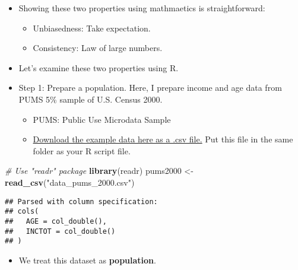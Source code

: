 \documentclass[]{book}
\newenvironment{Shaded}{\begin{snugshade}}{\end{snugshade}}
\newcommand{\KeywordTok}[1]{\textcolor[rgb]{0.13,0.29,0.53}{\textbf{#1}}}
\newcommand{\StringTok}[1]{\textcolor[rgb]{0.31,0.60,0.02}{#1}}
\newcommand{\CommentTok}[1]{\textcolor[rgb]{0.56,0.35,0.01}{\textit{#1}}}
\newcommand{\OperatorTok}[1]{\textcolor[rgb]{0.81,0.36,0.00}{\textbf{#1}}}
\newcommand{\NormalTok}[1]{#1}
\providecommand{\tightlist}{%
  \setlength{\itemsep}{0pt}\setlength{\parskip}{0pt}}
\begin{document}
\begin{itemize}
\item
  Showing these two properties using mathmaetics is straightforward:

  \begin{itemize}
  \tightlist
  \item
    Unbiasedness: Take expectation.
  \item
    Consistency: Law of large numbers.
  \end{itemize}
\item
  Let's examine these two properties using R.
\item
  Step 1: Prepare a population. Here, I prepare income and age data from
  PUMS 5\% sample of U.S. Census 2000.

  \begin{itemize}
  \tightlist
  \item
    PUMS: Public Use Microdata Sample
  \item
    \href{data_pums_2000.csv}{Download the example data here as a .csv
    file.} Put this file in the same folder as your R script file.
  \end{itemize}
\end{itemize}

\begin{Shaded}
\begin{Highlighting}[]
\CommentTok{# Use "readr" package}
\KeywordTok{library}\NormalTok{(readr)}
\NormalTok{pums2000 <-}\StringTok{ }\KeywordTok{read_csv}\NormalTok{(}\StringTok{"data_pums_2000.csv"}\NormalTok{) }
\end{Highlighting}
\end{Shaded}

\begin{verbatim}
## Parsed with column specification:
## cols(
##   AGE = col_double(),
##   INCTOT = col_double()
## )
\end{verbatim}

\begin{itemize}
\tightlist
\item
  We treat this dataset as \textbf{population}.
\end{itemize}

\begin{Shaded}
\end{Shaded}
\end{document}
